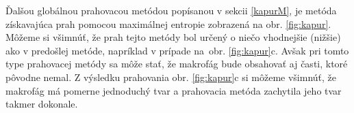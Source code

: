 \documentclass[a4paper,11pt,oneside]{article}%
\begin{document}
Ďalšou globálnou prahovacou metódou popísanou v sekcii \ref{kapurM}, je metóda získavajúca prah pomocou maximálnej entropie zobrazená na obr. \ref{fig:kapur}. Môžeme si všimnúť, že prah tejto metódy bol určený o niečo vhodnejšie (nižšie) ako v predošlej metóde, napríklad v prípade  na~obr. \ref{fig:kapur}c. Avšak pri tomto type prahovacej metódy sa môže stať, že makrofág bude obsahovať aj časti, ktoré pôvodne nemal. Z výsledku prahovania obr. \ref{fig:kapur}c si môžeme všimnúť, že makrofág má pomerne jednoduchý tvar a prahovacia metóda zachytila jeho tvar takmer dokonale.  

\begin{figure}[H]  
    \hspace{5px}

\end{figure}
\end{document}
